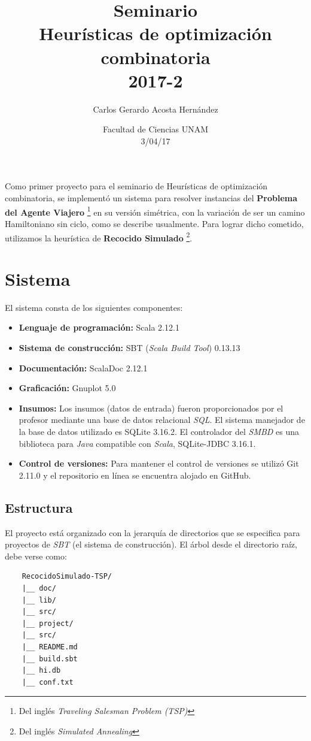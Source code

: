 \documentclass[12pt]{article}
\title{Seminario\\ Heurísticas de optimización combinatoria \\2017-2}
\author{Carlos Gerardo Acosta Hernández}
\date{Facultad de Ciencias UNAM \\ 3/04/17}
\begin{document}
\maketitle
Como primer proyecto para el seminario de Heurísticas de optimización combinatoria,
se implementó un sistema para resolver instancias del \textbf{Problema del Agente Viajero} \footnote{Del inglés \textit{Traveling Salesman Problem (TSP)}}
en su versión simétrica, con la variación de ser un camino Hamiltoniano sin ciclo, como se describe usualmente.
Para lograr dicho cometido, utilizamos la heurística de \textbf{Recocido Simulado} \footnote{Del inglés \textit{Simulated Annealing}}.


\section{Sistema}
El sistema consta de los siguientes componentes:
\begin{itemize}
\item \textbf{Lenguaje de programación:} Scala 2.12.1
\item \textbf{Sistema de construcción:} SBT (\textit{Scala Build Tool}) 0.13.13
\item \textbf{Documentación:} ScalaDoc 2.12.1
\item \textbf{Graficación:} Gnuplot 5.0
\item \textbf{Insumos:} Los insumos (datos de entrada) fueron proporcionados por el profesor mediante una base de datos relacional \textit{SQL}. El sistema manejador de la base de datos utilizado es SQLite 3.16.2. El controlador del \textit{SMBD} es una biblioteca para \textit{Java} compatible con \textit{Scala}, SQLite-JDBC 3.16.1.
\item \textbf{Control de versiones:} Para mantener el control de versiones se utilizó Git 2.11.0 y el repositorio en línea se encuentra alojado en GitHub.
\end{itemize}
\subsection{Estructura}\label{sec:e}
El proyecto está organizado con la jerarquía de directorios que se
especifica para proyectos de \textit{SBT} (el sistema de construcción).
El árbol desde el directorio raíz, debe verse como:
\begin{verbatim}
    RecocidoSimulado-TSP/
    |__ doc/
    |__ lib/
    |__ src/
    |__ project/
    |__ src/
    |__ README.md
    |__ build.sbt
    |__ hi.db
    |__ conf.txt
\end{verbatim}
\end{document}
